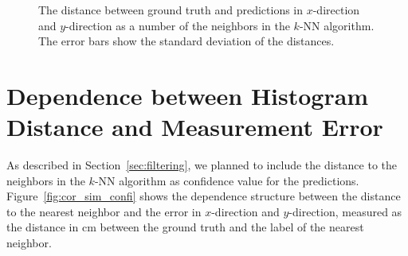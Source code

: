 \documentclass[11pt]{report}
\begin{document}
\begin{figure}[H]
\begin{subfigure}[b]{0.47\textwidth}
  \end{subfigure}
  \caption{The distance between ground truth and predictions in
    $x$-direction and $y$-direction as a number of the neighbors in
    the $k$-NN algorithm. The error bars show the standard deviation of
    the distances.}
  \label{fig:k}
\end{figure}

%
%

\section{Dependence between Histogram Distance and Measurement Error}

As described in Section~\ref{sec:filtering}, we planned to include the
distance to the neighbors in the $k$-NN algorithm as confidence value
for the predictions. Figure~\ref{fig:cor_sim_confi} shows the
dependence structure between the distance to the nearest neighbor and
the error in $x$-direction and $y$-direction, measured as the distance in cm
between the ground truth and the label of the nearest neighbor.
\end{document}
